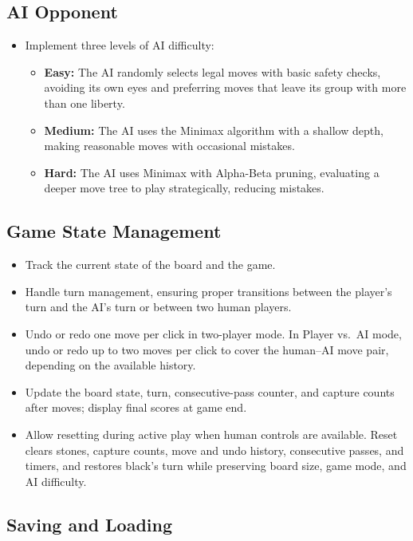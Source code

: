 \subsection{AI Opponent}

\begin{itemize}
    \item Implement three levels of AI difficulty:
    \begin{itemize}
        \item \textbf{Easy:} The AI randomly selects legal moves with basic safety checks, avoiding its own eyes and preferring moves that leave its group with more than one liberty.
        \item \textbf{Medium:} The AI uses the Minimax algorithm with a shallow depth, making reasonable moves with occasional mistakes.
        \item \textbf{Hard:} The AI uses Minimax with Alpha-Beta pruning, evaluating a deeper move tree to
        play strategically, reducing mistakes.
    \end{itemize}
\end{itemize}

\subsection{Game State Management}

\begin{itemize}
    \item Track the current state of the board and the game.
    \item Handle turn management, ensuring proper transitions between the player's turn and the AI's
turn or between two human players.
    \item Undo or redo one move per click in two-player mode. In Player vs.\ AI mode, undo or redo up to two moves per click to cover the human--AI move pair, depending on the available history.
    \item Update the board state, turn, consecutive-pass counter, and capture counts after moves; display final scores at game end.
    \item Allow resetting during active play when human controls are available. Reset clears stones, capture counts, move and undo history, consecutive passes, and timers, and restores black's turn while preserving board size, game mode, and AI difficulty.
\end{itemize}

\subsection{Saving and Loading}

